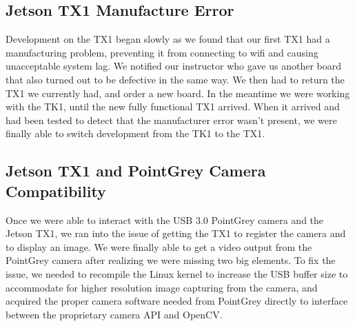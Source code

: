 \documentclass[letterpaper,10pt,titlepage]{IEEEtran}
\begin{document}
   \subsection{Jetson TX1 Manufacture Error}
   Development on the TX1 began slowly as we found that our first TX1 had a manufacturing problem, preventing it from connecting to wifi and causing unacceptable system lag. We notified our instructor who gave us another board that also turned out to be defective in the same way. We then had to return the TX1 we currently had, and order a new board. In the meantime we were working with the TK1, until the new fully functional TX1 arrived. When it arrived and had been tested to detect that the manufacturer error wasn't present, we were finally able to switch development from the TK1 to the TX1.
   
   \subsection{Jetson TX1 and PointGrey Camera Compatibility}
   Once we were able to interact with the USB 3.0 PointGrey camera and the Jetson TX1, we ran into the issue of getting the TX1 to register the camera and to display an image. We were finally able to get a video output from the PointGrey camera after realizing we were missing two big elements. To fix the issue, we needed to recompile the Linux kernel to increase the USB buffer size to accommodate for higher resolution image capturing from the camera, and acquired the proper camera software needed from PointGrey directly to interface between the proprietary camera API and OpenCV.
   
\end{document}
